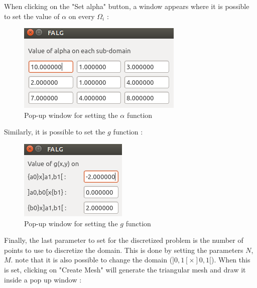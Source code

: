 \documentclass[a4paper]{report}
\begin{document}
When clicking on the "Set alpha" button, a window appears where it is possible to set the value of $\alpha$ on every $\Omega_i$ :
\begin{figure}[H]
\begin{center}
\includegraphics[scale=0.50]{set_alpha.png}\caption{Pop-up window for setting the $\alpha$ function}
\end{center}
\end{figure}
Similarly, it is possible to set the $g$ function :
\begin{figure}[H]
\begin{center}
\includegraphics[scale=0.50]{set_g.png}\caption{Pop-up window for setting the $g$ function}
\end{center}
\end{figure}
Finally, the last parameter to set for the discretized problem is the number of points to use to discretize the domain. This is done by setting the parameters $N$, $M$. note that it is also possible to change the domain ($]0,1[\times ]0,1[$). When this is set, clicking on "Create Mesh" will generate the triangular mesh and draw it inside a pop up window :
\end{document}
